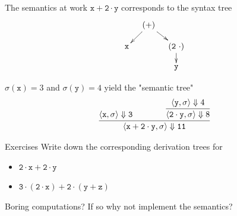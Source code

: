 \documentclass{beamer}
\begin{document}
\begin{frame}{The semantics at work}
        $\mathtt{x + 2 \cdot y}$ corresponds to the 
        \alert{syntax} tree
        \[
                \xymatrix@C=10pt@R=10pt{
                        & (+) \ar[dl] \ar[dr]  & \\
                        \mathtt{x} & & \mathtt{(2\ \cdot)} \ar[d] \\
                        & & \mathtt{y} 
                }
        \]

        \vspace{0.4cm}
        $\sigma(\mathtt{x}) = 3$ and $\sigma(\mathtt{y}) = 4$
        yield the "\alert{semantic} tree"
        \[
                \infer{\langle \mathtt{ x + 2 \cdot y}, \sigma \rangle \Downarrow 
                \mathtt{11} }{
                        \langle \mathtt{x}, \sigma \rangle \Downarrow \mathtt{3} 
                        \qquad \qquad
                        \infer{\langle \mathtt{2 \cdot y}, \sigma \rangle \Downarrow 8}{
                        \langle \mathtt{y}, \sigma \rangle \Downarrow 4}
                }
        \]
\end{frame}

\begin{frame}{Exercises}
        Write down the corresponding derivation trees for
        \begin{itemize}
                \item $\mathtt{2 \cdot x + 2 \cdot y}$
                \item $\mathtt{3 \cdot (2 \cdot x) + 2 \cdot (y + z)}$ 
        \end{itemize}

        \pause
        \bigskip
        Boring computations? If so why not implement the semantics?
\end{frame}
\end{document}
